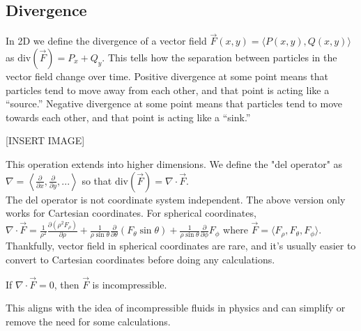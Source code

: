 \subsection{Divergence}
\noindent
In 2D we define the divergence of a vector field $\vec{F}(x,y)=\langle P(x,y), Q(x,y)\rangle$ as $\text{div}(\vec{F})=P_x+Q_y$. This tells how the separation between particles in the vector field change over time. Positive divergence at some point means that particles tend to move away from each other, and that point is acting like a “source.” Negative divergence at some point means that particles tend to move towards each other, and that point is acting like a “sink.”

[INSERT IMAGE]

\noindent
This operation extends into higher dimensions. We define the "del operator" as\\
$\nabla = \left<\frac{\partial}{\partial x},\frac{\partial}{\partial y},...\right>$ so that $\text{div}(\vec{F})=\nabla\cdot\vec{F}$.\\
The del operator is not coordinate system independent. The above version only works for Cartesian coordinates. For spherical coordinates,\\
$\nabla\cdot\vec{F}=\frac{1}{\rho^2}\frac{\partial(\rho^2 F_\rho)}{\partial\rho}+\frac{1}{\rho\sin{\theta}}\frac{\partial}{\partial\theta}(F_\theta \sin{\theta})+\frac{1}{\rho\sin{\theta}}\frac{\partial}{\partial\phi}F_\phi$ where $\vec{F}=\langle F_\rho, F_\theta, F_\phi \rangle$.\\
Thankfully, vector field in spherical coordinates are rare, and it's usually easier to convert to Cartesian coordinates before doing any calculations.\\

\begin{definition}
	If $\nabla\cdot\vec{F}=0$, then $\vec{F}$ is incompressible.
\end{definition}
\noindent
This aligns with the idea of incompressible fluids in physics and can simplify or remove the need for some calculations.

